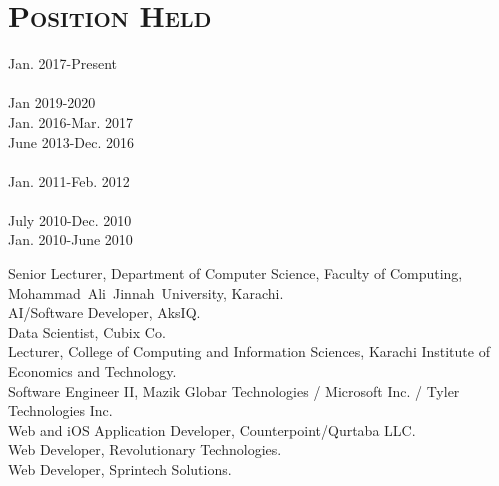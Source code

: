 \documentclass[a4paper, 10pt]{article}
\begin{document}
\section*{\normalfont\textsc{Position Held}}
\hfill\begin{minipage}{0.22\textwidth}
Jan. 2017-Present\textcolor{lightgray}{\dotfill}\\\\
Jan 2019-2020\textcolor{lightgray}{\dotfill}\\
Jan. 2016-Mar. 2017\textcolor{lightgray}{\dotfill}\\
June 2013-Dec. 2016\textcolor{lightgray}{\dotfill}\\\\
Jan. 2011-Feb. 2012\textcolor{lightgray}{\dotfill}\\\\
July 2010-Dec. 2010\textcolor{lightgray}{\dotfill}\\
Jan. 2010-June 2010\textcolor{lightgray}{\dotfill}\\
\end{minipage}
\begin{minipage}{0.75\textwidth}
Senior Lecturer, Department of Computer Science, Faculty of Computing, Mohammad~Ali~Jinnah~University, Karachi.\\
AI/Software Developer, AksIQ.\\
Data Scientist, Cubix Co.\\
Lecturer, College of Computing and Information Sciences, Karachi Institute of Economics and Technology.\\
Software Engineer II, Mazik Globar Technologies / Microsoft Inc. / Tyler Technologies Inc.\\
Web and iOS Application Developer, Counterpoint/Qurtaba LLC.\\
Web Developer, Revolutionary Technologies.\\
Web Developer, Sprintech Solutions.
\end{minipage}



\end{document}
